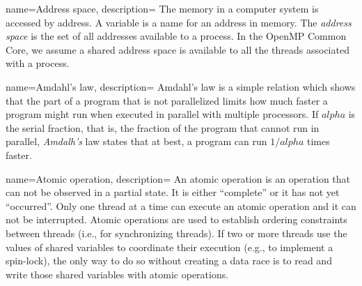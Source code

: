 %
%
%
%
%
%

{
   name={Address space},
   description={
                The memory in a computer system is accessed by address.  A variable is a name for an address
                 in memory.  The \emph{address space} is the set of all addresses available to a process.  
                 In the OpenMP Common Core, we assume a shared address space is available to all the threads
                 associated with a process.}
}

{
   name={Amdahl's law},
   description={
   Amdahl's law is a simple relation which shows that the part of a program that is not parallelized limits how 
   much faster a program might run when executed in parallel with multiple processors.
   If $alpha$ is the serial fraction, that is, the fraction of the program that cannot run in parallel,
   \emph{Amdalh's} law states that at best, a program can run $1/alpha$ times faster.  
   }
}   

{
   name={Atomic operation},
   description={
      An atomic operation is an operation that can not be observed in a partial state.  It is either ``complete'' or it has not yet ``occurred''.
      Only one thread at a time can execute an atomic operation and it can not be interrupted.   Atomic operations are 
      used to establish ordering constraints between threads (i.e., for synchronizing threads).  If two or more threads 
      use the values of shared variables to 
      coordinate their execution (e.g., to implement a spin-lock), the only way to do so without creating a data race is to 
      read and write those shared variables with atomic operations.       
      }
}

